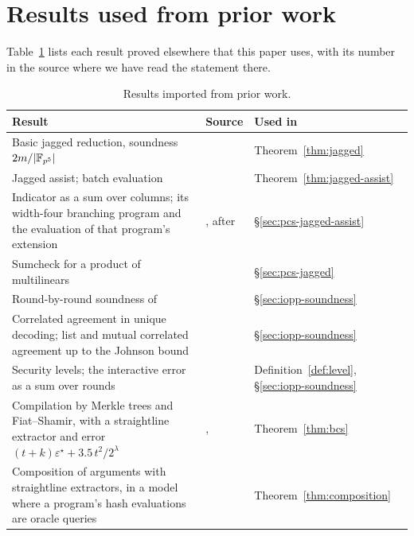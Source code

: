 \section{Results used from prior work}
\label{sec:app-prior}

Table~\ref{tab:prior} lists each result proved elsewhere that this paper uses, with its number in the source where we have read the statement there.

\begin{table}[t]
\centering
\small
\caption{Results imported from prior work.}
\label{tab:prior}
\begin{tabular}{@{}>{\raggedright\arraybackslash}p{}>{\raggedright\arraybackslash}p{}>{\raggedright\arraybackslash}p{}@{}}
\toprule
Result & Source & Used in \\
\midrule
Basic jagged reduction, soundness $2m/|\mathbb{F}_{p^5}|$ & \citep[Thm.~1.4]{jagged-pcs} & Theorem~\ref{thm:jagged} \\
Jagged assist; batch evaluation & \citep[Thm.~1.5, Lemma~5.1]{jagged-pcs} & Theorem~\ref{thm:jagged-assist} \\
Indicator as a sum over columns; its width-four branching program and the evaluation of that program's extension & \citep[Claims~3.2.1, 3.2.2, Lemma~4.2]{jagged-pcs}, after~\citep{hr18} & \S\ref{sec:pcs-jagged-assist} \\
Sumcheck for a product of multilinears & \citep[Lemma~2.3]{jagged-pcs} & \S\ref{sec:pcs-jagged} \\
Round-by-round soundness of \WHIR{} & \citep{whir} & \S\ref{sec:iopp-soundness} \\
Correlated agreement in unique decoding; list and mutual correlated agreement up to the Johnson bound & \citep[Cor.~1.4, Thm.~4.6]{proximity-gaps-2025} & \S\ref{sec:iopp-soundness} \\
Security levels; the interactive error as a sum over rounds & \citep[\S28.2, Claim~31.1.3]{chiesa-yogev} & Definition~\ref{def:level}, \S\ref{sec:iopp-soundness} \\
Compilation by Merkle trees and Fiat--Shamir, with a straightline extractor and error $(t+k)\varepsilon^\star + 3.5\,t^2/2^{\lambda}$ & \citep{bcs16}, \citep[Thms.~26.1.1, 31.3.1]{chiesa-yogev} & Theorem~\ref{thm:bcs} \\
Composition of arguments with straightline extractors, in a model where a program's hash evaluations are oracle queries & \citep[Thms.~5.1, 6.5]{cgsy24} & Theorem~\ref{thm:composition} \\

\end{tabular}
\end{table}
